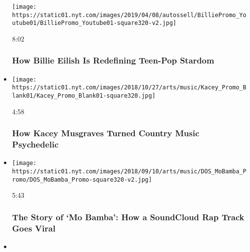 \begin{itemize}
  \texttt{[image: https://static01.nyt.com/images/2019/04/08/autossell/BilliePromo\_Youtube01/BilliePromo\_Youtube01-square320-v2.jpg]}

  8:02

  \hypertarget{how-billie-eilish-is-redefining-teen-pop-stardom}{%
  \subsubsection{How Billie Eilish Is Redefining Teen-Pop
  Stardom}\label{how-billie-eilish-is-redefining-teen-pop-stardom}}
\item
  \href{https://www.nytimes.com/video/arts/music/100000006000270/kacey-musgraves-slow-burn-country-music.html?action=click\&module=video-series-bar\&region=header\&pgtype=Article\&playlistId=video/diaryofasong}{}

  \texttt{[image: https://static01.nyt.com/images/2018/10/27/arts/music/Kacey\_Promo\_Blank01/Kacey\_Promo\_Blank01-square320.jpg]}

  4:58

  \hypertarget{how-kacey-musgraves-turned-country-music-psychedelic}{%
  \subsubsection{How Kacey Musgraves Turned Country Music
  Psychedelic}\label{how-kacey-musgraves-turned-country-music-psychedelic}}
\item
  \href{https://www.nytimes.com/video/arts/music/100000006000184/mo-bamba-sheck-wes-rap.html?action=click\&module=video-series-bar\&region=header\&pgtype=Article\&playlistId=video/diaryofasong}{}

  \texttt{[image: https://static01.nyt.com/images/2018/09/10/arts/music/DOS\_MoBamba\_Promo/DOS\_MoBamba\_Promo-square320-v2.jpg]}

  5:43

  \hypertarget{the-story-of-mo-bamba-how-a-soundcloud-rap-track-goes-viral}{%
  \subsubsection{The Story of `Mo Bamba': How a SoundCloud Rap Track
  Goes
  Viral}\label{the-story-of-mo-bamba-how-a-soundcloud-rap-track-goes-viral}}
\item
  \href{https://www.nytimes.com/video/arts/music/100000005858557/watch-how-a-pop-hit-is-made.html?action=click\&module=video-series-bar\&region=header\&pgtype=Article\&playlistId=video/diaryofasong}{}


\end{itemize}
